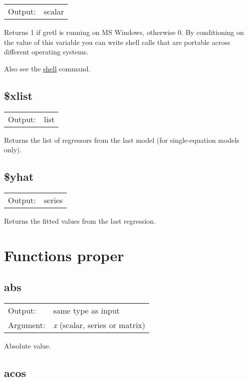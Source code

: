\begin{tabular}{ll}
Output:     & scalar\\
\end{tabular}

	  Returns 1 if gretl is running on MS Windows, otherwise 0. By
	  conditioning on the value of this variable you can write shell
	  calls that are portable across different operating systems.

	  Also see the \hyperlink{cmd-shell}{shell} command.

\subsection{\$xlist}
\hypertarget{func-dolxlist}{}

\begin{tabular}{ll}
Output:     & list\\
\end{tabular}

	  Returns the list of regressors from the last model (for
	  single-equation models only).

\subsection{\$yhat}
\hypertarget{func-dolyhat}{}

\begin{tabular}{ll}
Output:     & series\\
\end{tabular}

	  Returns the fitted values from the last regression.

\section{Functions proper}
\label{sec:functions}

\subsection{abs}
\hypertarget{func-abs}{}

\begin{tabular}{ll}
Output:     & same type as input\\
Argument:   & \textsl{x} (scalar, series or matrix)\\
\end{tabular}

	  Absolute value.

\subsection{acos}
\hypertarget{func-acos}{}

